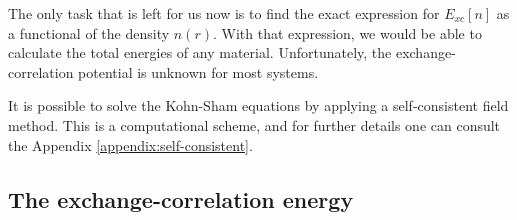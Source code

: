 The only task that is left for us now is to find the exact expression for $E_{xc}[n]$ as a functional of the density $n(r)$. With that expression, we would be able to calculate the total energies of any material. %
Unfortunately, the exchange-correlation potential is unknown for most systems.

It is possible to solve the Kohn-Sham equations by applying a self-consistent field method. This is a computational scheme, and for further details one can consult the Appendix \ref{appendix:self-consistent}.




\subsection{The exchange-correlation energy}


